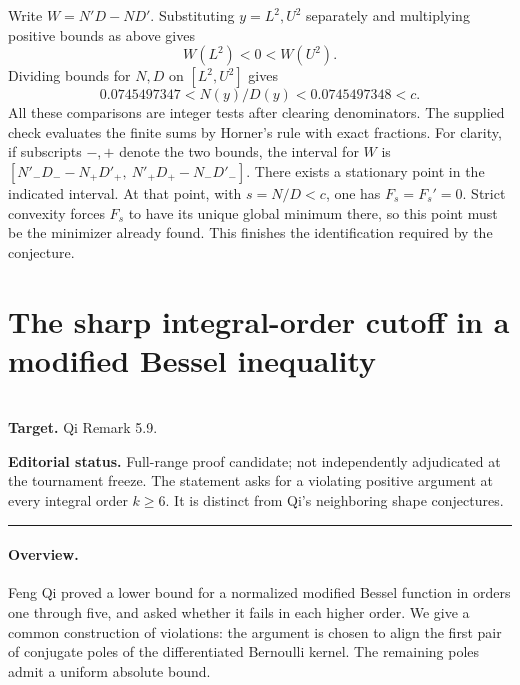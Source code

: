 \documentclass[11pt,a4paper]{article}
\begin{document}
Write $W=N'D-ND'$. Substituting $y=L^2,U^2$ separately and multiplying positive bounds as above gives
\[
 W(L^2)<0<W(U^2).
\]
Dividing bounds for $N,D$ on $[L^2,U^2]$ gives
\[
 0.0745497347<N(y)/D(y)<0.0745497348<c.
\]
All these comparisons are integer tests after clearing denominators. The supplied check evaluates the finite sums by Horner's rule with exact fractions. For clarity, if subscripts $-,+$ denote the two bounds, the interval for $W$ is $[N'_-D_- -N_+D'_+,\ N'_+D_+ -N_-D'_-]$. There exists a stationary point in the indicated interval. At that point, with $s=N/D<c$, one has $F_s=F_s'=0$. Strict convexity forces $F_s$ to have its unique global minimum there, so this point must be the minimizer already found. This finishes the identification required by the conjecture.
\endgroup


\clearpage

\section{The sharp integral-order cutoff in a modified Bessel inequality}
\label{section:R22H}
\\[3pt]
\noindent\textbf{Target.} Qi Remark 5.9.

\noindent\textbf{Editorial status.} Full-range proof candidate; not independently adjudicated at the tournament freeze. The statement asks for a violating positive argument at every integral order $k\ge6$. It is distinct from Qi's neighboring shape conjectures.

\smallskip\hrule\medskip



\begingroup
\newcommand{\ii}{\mathrm{i}}
\newcommand{\R}{\operatorname{Re}}
\setcounter{equation}{0}
\renewcommand{\theequation}{\thesection.\arabic{equation}}
\renewcommand{\theHequation}{R22H.\arabic{equation}}
\paragraph{Overview.}
Feng Qi proved a lower bound for a normalized modified Bessel function in
orders one through five, and asked whether it fails in each higher order.
We give a common construction of violations: the argument is chosen to
align the first pair of conjugate poles of the differentiated Bernoulli
kernel. The remaining poles admit a uniform absolute bound.
\end{document}
